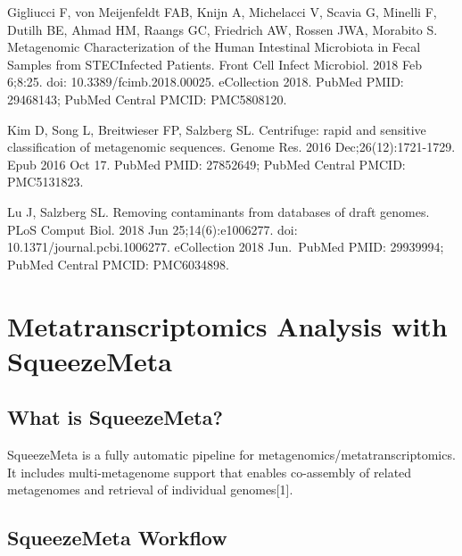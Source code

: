 \documentclass[
]{book}
\begin{document}
Gigliucci F, von Meijenfeldt FAB, Knijn A, Michelacci V, Scavia G, Minelli F, Dutilh BE, Ahmad HM, Raangs GC, Friedrich
AW, Rossen JWA, Morabito S. Metagenomic Characterization of the Human Intestinal Microbiota in Fecal Samples from STECInfected
Patients. Front Cell Infect Microbiol. 2018 Feb 6;8:25. doi: 10.3389/fcimb.2018.00025. eCollection 2018. PubMed
PMID: 29468143; PubMed Central PMCID: PMC5808120.

Kim D, Song L, Breitwieser FP, Salzberg SL. Centrifuge: rapid and sensitive classification of metagenomic sequences. Genome
Res. 2016 Dec;26(12):1721-1729. Epub 2016 Oct 17. PubMed PMID: 27852649; PubMed Central PMCID: PMC5131823.

Lu J, Salzberg SL. Removing contaminants from databases of draft genomes. PLoS Comput Biol. 2018 Jun 25;14(6):e1006277.
doi: 10.1371/journal.pcbi.1006277. eCollection 2018 Jun.~PubMed PMID: 29939994; PubMed Central PMCID: PMC6034898.

\hypertarget{metatranscriptomics-analysis-with-squeezemeta}{%
\chapter{Metatranscriptomics Analysis with SqueezeMeta}\label{metatranscriptomics-analysis-with-squeezemeta}}

\hypertarget{what-is-squeezemeta}{%
\section{What is SqueezeMeta?}\label{what-is-squeezemeta}}

SqueezeMeta is a fully automatic pipeline for metagenomics/metatranscriptomics. It includes multi-metagenome support that enables co-assembly of related metagenomes and retrieval of individual genomes{[}1{]}.

\hypertarget{squeezemeta-workflow}{%
\section{SqueezeMeta Workflow}\label{squeezemeta-workflow}}
\end{document}
